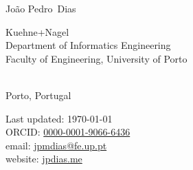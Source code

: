 \documentclass[10pt, a4paper]{article}
\makeatletter
\newcommand{\FEUP}{Faculty of Engineering, University of Porto}
\newcommand{\FirstName}{João Pedro}
\newcommand{\LastName}{Dias}
\newcommand{\MyName}{\FirstName\ \LastName}
\newcommand{\Email}{jpmdias@fe.up.pt}
\newcommand{\Website}{jpdias.me}
\newcommand{\ORCID}{0000-0001-9066-6436}
\newcommand{\Affiliation}{
    \adforn{10} Kuehne+Nagel\\
    \adforn{10} Department of Informatics Engineering
    \\
    \FEUP
}
\newcommand{\Address}{Porto, Portugal}
\makeatother
\begin{document}
\thispagestyle{firststyle}

{\color{awesome}\fontsize{24pt}{0}\selectfont\MyName \hfill {}}\\

\begin{minipage}[t]{0.595\textwidth}
	\Affiliation
	\\
	\Address
\end{minipage}
\begin{minipage}[t]{0.4\textwidth}
	\begin{flushright}
		Last updated: \monthyear\today
		\\
		ORCID: \href{https://orcid.org/\ORCID}{\ORCID}
		\\
		email: \href{mailto:\Email}{\Email}
		\\
		website: \href{https://\Website}{\Website}
	\end{flushright}
\end{minipage}
\begin{center}
	\color{awesome} 
	\vspace{-0.85cm}
\end{center}
\end{document}
